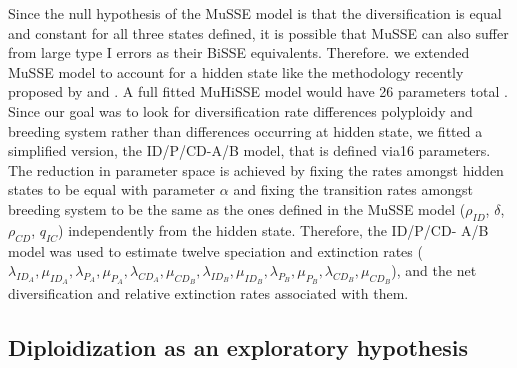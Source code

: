 
Since the null hypothesis of the MuSSE model is that the diversification is equal and constant for all three states defined, it is possible that MuSSE can also suffer from large type I errors as their BiSSE equivalents. Therefore. we extended MuSSE model to account for a hidden state like the methodology recently proposed by \citet{caetano_2018} and \citet{herrera_2018}. A full fitted MuHiSSE model would have 26 parameters total \citep{herrera_2018}. Since our goal was to look for diversification rate differences polyploidy and breeding system rather than differences occurring at  hidden state, we fitted a simplified version, the  ID/P/CD-A/B model, that is defined via16 parameters. The reduction in parameter space is achieved by fixing the rates amongst hidden states to be equal with parameter $\alpha$ and fixing the transition rates amongst breeding system to be the same as  the ones defined in the MuSSE model ($\rho_{ID}$,  $\delta$,  $\rho_{CD}$,  $q_{IC}$) independently from the hidden state.   Therefore, the ID/P/CD- A/B model was used to estimate twelve speciation and extinction rates ($\lambda_{ID_A}, \mu_{ID_A},\lambda_{P_A},\mu_{P_A}, \lambda_{CD_A},\mu_{CD_B},\lambda_{ID_B}, \mu_{ID_B},\lambda_{P_B},\mu_{P_B}, \lambda_{CD_B},\mu_{CD_B}$), and the net diversification and relative extinction rates associated with them.\newline

\subsection{Diploidization as an exploratory hypothesis}


